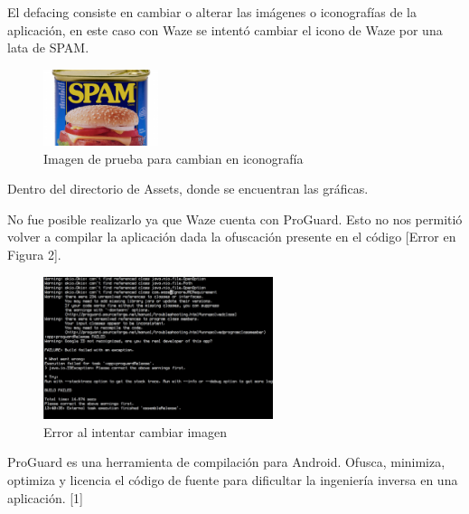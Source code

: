     El defacing consiste en cambiar o alterar las imágenes o iconografías de la aplicación, en este caso con Waze se intentó cambiar el icono de Waze por una lata de SPAM.
    \begin{figure}[H]
  \begin{center}
    \includegraphics[width=0.3\textwidth]{imagenes/fig24.png}
    \caption{Imagen de prueba para cambian en iconografía}
  \end{center}
\end{figure}

Dentro del directorio de Assets, donde se encuentran las gráficas.

No fue posible realizarlo ya que Waze cuenta con ProGuard. Esto no nos permitió volver a compilar la aplicación dada la ofuscación presente en el código [Error en Figura 2].

    \begin{figure}[H]
  \begin{center}
    \includegraphics[width=0.6\textwidth]{imagenes/fig25.png}
    \caption{Error al intentar cambiar imagen}
  \end{center}
\end{figure}

ProGuard es una herramienta de compilación para Android. Ofusca, minimiza, optimiza y licencia el código de fuente para dificultar la ingeniería inversa en una aplicación. [1]